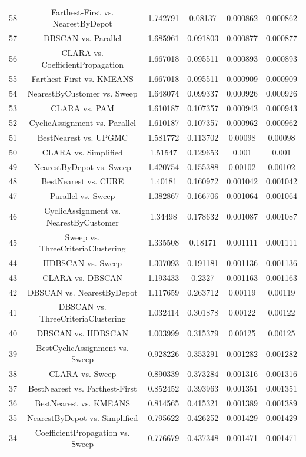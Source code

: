 \documentclass[a4paper,10pt]{article}
\begin{document}
\begin{landscape}
\begin{table}[!htp]
\begin{tabular}{cccccc}
58&Farthest-First vs. NearestByDepot&1.742791&0.08137&0.000862&0.000862\\
57&DBSCAN vs. Parallel&1.685961&0.091803&0.000877&0.000877\\
56&CLARA vs. CoefficientPropagation&1.667018&0.095511&0.000893&0.000893\\
55&Farthest-First vs. KMEANS&1.667018&0.095511&0.000909&0.000909\\
54&NearestByCustomer vs. Sweep&1.648074&0.099337&0.000926&0.000926\\
53&CLARA vs. PAM&1.610187&0.107357&0.000943&0.000943\\
52&CyclicAssignment vs. Parallel&1.610187&0.107357&0.000962&0.000962\\
51&BestNearest vs. UPGMC&1.581772&0.113702&0.00098&0.00098\\
50&CLARA vs. Simplified&1.51547&0.129653&0.001&0.001\\
49&NearestByDepot vs. Sweep&1.420754&0.155388&0.00102&0.00102\\
48&BestNearest vs. CURE&1.40181&0.160972&0.001042&0.001042\\
47&Parallel vs. Sweep&1.382867&0.166706&0.001064&0.001064\\
46&CyclicAssignment vs. NearestByCustomer&1.34498&0.178632&0.001087&0.001087\\
45&Sweep vs. ThreeCriteriaClustering&1.335508&0.18171&0.001111&0.001111\\
44&HDBSCAN vs. Sweep&1.307093&0.191181&0.001136&0.001136\\
43&CLARA vs. DBSCAN&1.193433&0.2327&0.001163&0.001163\\
42&DBSCAN vs. NearestByDepot&1.117659&0.263712&0.00119&0.00119\\
41&DBSCAN vs. ThreeCriteriaClustering&1.032414&0.301878&0.00122&0.00122\\
40&DBSCAN vs. HDBSCAN&1.003999&0.315379&0.00125&0.00125\\
39&BestCyclicAssignment vs. Sweep&0.928226&0.353291&0.001282&0.001282\\
38&CLARA vs. Sweep&0.890339&0.373284&0.001316&0.001316\\
37&BestNearest vs. Farthest-First&0.852452&0.393963&0.001351&0.001351\\
36&BestNearest vs. KMEANS&0.814565&0.415321&0.001389&0.001389\\
35&NearestByDepot vs. Simplified&0.795622&0.426252&0.001429&0.001429\\
34&CoefficientPropagation vs. Sweep&0.776679&0.437348&0.001471&0.001471\\

\end{tabular}
\end{table}
\end{landscape}
\end{document}
